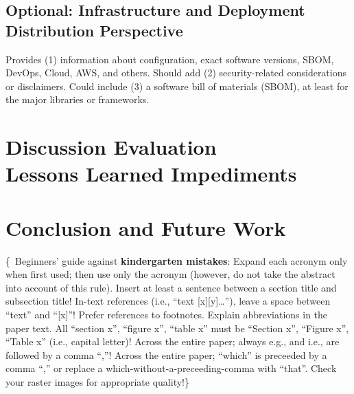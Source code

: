 \documentclass[conference,a4paper,flushend]{cs-techrep} %
\begin{document}
\subsection{Optional: Infrastructure and Deployment \textbar{} Distribution Perspective \textbar{} }
Provides (1) information about configuration, exact software versions, SBOM, DevOps, Cloud, AWS, and others.
Should add (2) security-related considerations or disclaimers.
Could include (3) a software bill of materials (SBOM), at least for the major libraries or frameworks.


\section{Discussion \textbar{} Evaluation \textbar{} \\ Lessons Learned \textbar{} Impediments}
\lipsum[16]

\section{Conclusion and Future Work \textbar{} \\ }

\vspace{\baselineskip}
\{\,\faWarning{} Beginners' guide against \textbf{kindergarten mistakes}:
Expand each acronym only when first used; then use only the acronym (however, do not take the abstract into account of this rule).
Insert at least a sentence between a section title and subsection title!
In-text references (i.e., \enquote{text [x][y]\ldots{}}), leave a space between \enquote{text} and \enquote{[x]}!
Prefer references to footnotes.
Explain abbreviations in the paper text.
All \enquote{section x}, \enquote{figure x}, \enquote{table x} must be \enquote{Section x}, \enquote{Figure x}, \enquote{Table x} (i.e., capital letter)!
Across the entire paper; always e.g., and i.e., are followed by a comma \enquote{,}!
Across the entire paper; \enquote{which} is preceeded by a comma \enquote{,} or replace a which-without-a-preceeding-comma with \enquote{that}.
Check your raster images for appropriate quality!\}
\end{document}
